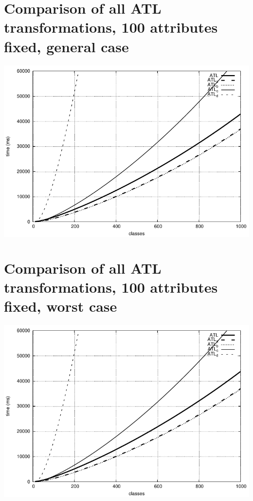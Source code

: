 \documentclass[a4paper,final]{article}
\begin{document}
\section*{Comparison of all ATL transformations, 100 attributes fixed, general case}
\includegraphics[width=\textwidth]{atl_compared_general_100attributes}

\section*{Comparison of all ATL transformations, 100 attributes fixed, worst case}
\includegraphics[width=\textwidth]{atl_compared_worst_100attributes}
\end{document}

